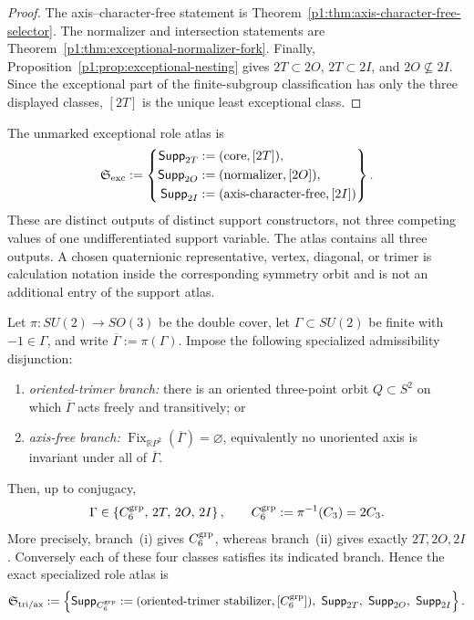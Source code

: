 \documentclass[11pt]{article}
\begin{document}
\begin{proof}
The axis--character-free statement is
Theorem~\ref{p1:thm:axis-character-free-selector}.  The normalizer and
intersection statements are
Theorem~\ref{p1:thm:exceptional-normalizer-fork}.  Finally,
Proposition~\ref{p1:prop:exceptional-nesting} gives
\(2T\subset2O\), \(2T\subset2I\), and \(2O\nsubseteq2I\).  Since the
exceptional part of the finite-subgroup classification has only the three
displayed classes, \([2T]\) is the unique least exceptional class.
\end{proof}

\begin{definition}
\label{p1:def:exceptional-support-role-atlas}
The unmarked exceptional role atlas is
\[
 \mathfrak S_{\rm exc}:=
 \left\{\begin{aligned}
 \mathsf{Supp}_{2T}&:=(\mathrm{core},[2T]),\\
 \mathsf{Supp}_{2O}&:=(\mathrm{normalizer},[2O]),\\
 \mathsf{Supp}_{2I}&:=(\mathrm{axis\text{-}character\text{-}free},[2I])
 \end{aligned}\right\}.
\]
These are distinct outputs of distinct support constructors, not three
competing values of one undifferentiated support variable. The atlas contains
all three outputs. A chosen quaternionic representative, vertex,
diagonal, or trimer is calculation notation inside the corresponding symmetry
orbit and is not an additional entry of the support atlas.
\end{definition}

\begin{theorem}
\label{p1:thm:trimer-axis-binary-support-range}
Let \(\pi:SU(2)\to SO(3)\) be the double cover, let
\(\Gamma\subset SU(2)\) be finite with \(-1\in\Gamma\), and write
\(\overline\Gamma:=\pi(\Gamma)\).  Impose the following specialized
admissibility disjunction:
\begin{enumerate}[label=(\roman*)]
  \item \emph{oriented-trimer branch:} there is an oriented
  three-point orbit \(Q\subset S^2\) on which \(\overline\Gamma\) acts
  freely and transitively; or
  \item \emph{axis-free branch:}
  \(\operatorname{Fix}_{\mathbb{R}P^2}(\overline\Gamma)=\varnothing\),
  equivalently no unoriented axis is invariant under all of
  \(\overline\Gamma\).
\end{enumerate}
Then, up to conjugacy,
\[
  \Gamma\in
  \left\{C_6^{\rm grp},\,2T,\,2O,\,2I\right\},
  \qquad
  C_6^{\rm grp}:=\pi^{-1}(C_3)=2C_3.
\]
More precisely, branch~(i) gives \(C_6^{\rm grp}\), whereas branch~(ii)
gives exactly \(2T,2O,2I\).  Conversely each of these four classes satisfies
its indicated branch.  Hence the exact specialized role atlas is
\[
 \mathfrak S_{\rm tri/ax}
 :=
 \left\{
   \mathsf{Supp}_{C_6^{\rm grp}}
      :=(\mathrm{oriented\text{-}trimer\ stabilizer},[C_6^{\rm grp}]),
   \ \mathsf{Supp}_{2T},\ \mathsf{Supp}_{2O},\ \mathsf{Supp}_{2I}
 \right\}.
\]
\end{theorem}
\end{document}
